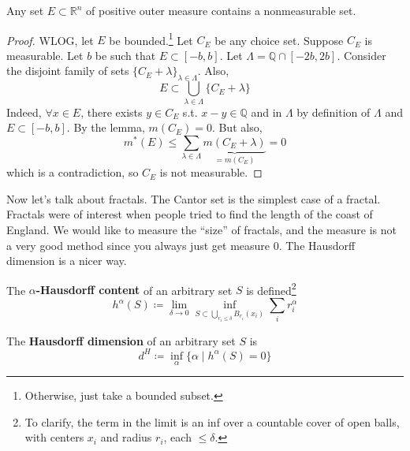   \begin{theorem}
    Any set $E \subset \mathbb{R}^n$ of positive outer measure contains a nonmeasurable set. 
  \end{theorem}
  \begin{proof}
    WLOG, let $E$ be bounded.\footnote{Otherwise, just take a bounded subset.} Let $C_E$ be any choice set. Suppose $C_E$ is measurable. Let $b$ be such that $E \subset [-b, b]$. Let $\Lambda = \mathbb{Q} \cap [-2b, 2b]$. Consider the disjoint family of sets $\{C_E + \lambda\}_{\lambda \in \Lambda}$. Also, 
    \begin{equation}
      E \subset \bigcup_{\lambda \in \Lambda} \{ C_E + \lambda \}
    \end{equation}
    Indeed, $\forall x \in E$, there exists $y \in C_E$ s.t. $x - y \in \mathbb{Q}$ and in $\Lambda$ by definition of $\Lambda$ and $E \subset [-b, b]$. By the lemma, $m(C_E) = 0$. But also, 
    \begin{equation}
      m^\ast (E) \leq \sum_{\lambda \in \Lambda} \underbrace{m(C_E + \lambda)}_{= m(C_E)} = 0
    \end{equation}
    which is a contradiction, so $C_E$ is not measurable. 
  \end{proof}

  Now let's talk about fractals. The Cantor set is the simplest case of a fractal. Fractals were of interest when people tried to find the length of the coast of England. We would like to measure the ``size'' of fractals, and the measure is not a very good method since you always just get measure $0$. The Hausdorff dimension is a nicer way. 

  \begin{definition}
    The \textbf{$\alpha$-Hausdorff content} of an arbitrary set $S$ is defined\footnote{To clarify, the term in the limit is an inf over a countable cover of open balls, with centers $x_i$ and radius $r_i$, each $\leq \delta$. }
    \begin{equation}
      h^\alpha (S) \coloneqq \lim_{\delta \to 0} \inf_{S \subset \bigcup_{r_i \leq \delta } B_{r_i} (x_i)} \sum_i r_i^\alpha
    \end{equation}
  \end{definition}

  \begin{definition}
    The \textbf{Hausdorff dimension} of an arbitrary set $S$ is 
    \begin{equation}
      d^H \coloneqq \inf_\alpha \{\alpha \mid h^\alpha(S) = 0 \} 
    \end{equation}
  \end{definition}

